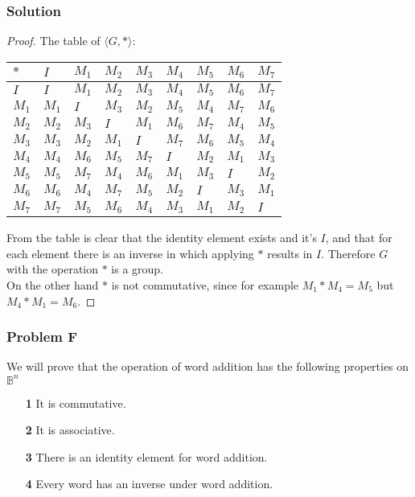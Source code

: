 \documentclass[11pt]{article}
\begin{document}
	\subsubsection*{Solution}
	\begin{proof}
	The table of $\langle G, * \rangle$:\\
		\begin{adjustbox}{max width=\textwidth,center}
		\begin{tabular}{l|llllllll}
			$*$ & $I$ & $M_1$ & $M_2$ & $M_3$ & $M_4$ & $M_5$ & $M_6$ & $M_7$\\ \hline
			$I$ & $I$ & $M_1$ & $M_2$ & $M_3$ & $M_4$ & $M_5$ & $M_6$ & $M_7$\\
			$M_1$ & $M_1$ & $I$ & $M_3$ & $M_2$ & $M_5$ & $M_4$ & $M_7$ & $M_6$ \\
			$M_2$ & $M_2$ & $M_3$ & $I$ & $M_1$ & $M_6$ & $M_7$ & $M_4$ & $M_5$ \\
			$M_3$ & $M_3$ & $M_2$ & $M_1$ & $I$ & $M_7$ & $M_6$ & $M_5$ & $M_4$ \\
			$M_4$ & $M_4$ & $M_6$ & $M_5$ & $M_7$ & $I$ & $M_2$ & $M_1$ & $M_3$ \\
			$M_5$ & $M_5$ & $M_7$ & $M_4$ & $M_6$ & $M_1$ & $M_3$ & $I$ & $M_2$ \\
			$M_6$ & $M_6$ & $M_4$ & $M_7$ & $M_5$ & $M_2$ & $I$ & $M_3$ & $M_1$ \\
			$M_7$ & $M_7$ & $M_5$ & $M_6$ & $M_4$ & $M_3$ & $M_1$ & $M_2$ & $I$ \\
		\end{tabular}
		\end{adjustbox}

	From the table is clear that the identity element exists and it's $I$, and that for each element there is an inverse in which applying $*$ results in $I$. Therefore $G$ with the operation $*$ is a group.\\
	On the other hand $*$ is not commutative, since for example $M_1 * M_4 = M_5$ but $M_4 * M_1 = M_6$.
	\end{proof}
	\subsubsection*{Problem F}
	We will prove that the operation of word addition has the following properties on $\mathbb{B}^n$
	\begin{itemize}
		\item [\textbf{1}] It is commutative.
		\item [\textbf{2}] It is associative.
		\item [\textbf{3}] There is an identity element for word addition.
		\item [\textbf{4}] Every word has an inverse under word addition.
	\end{itemize}
\end{document}
